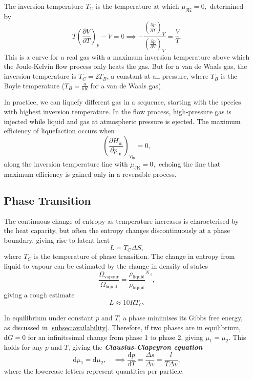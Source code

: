 \documentclass{article}
\theoremstyle{nonumberplain}
\begin{document}
The inversion temperature $T_C$ is the temperature at which $\mu_{\mathrm{JK} } =0,$ determined by 
\[
    T \left( \frac{\partial V}{\partial T} \right)_{p} - V= 0
    \implies 
    -\frac{\left( \frac{\partial p}{\partial T} \right)_{V} }{\left( \frac{\partial p}{\partial V} \right)_{T} } = \frac{V}{T}.
\] 
This is a curve for a real gas with a maximum inversion temperature above which the Joule-Kelvin flow process only heats the gas. But for a van de Waals gas, the inversion temperature is $T_C = 2 T_B$, a constant at all pressure, where $T_B$ is the Boyle temperature ($T_B = \frac{a}{b R}$ for a van de Waals gas).

In practice, we can liquefy different gas in a sequence, starting with the species with highest inversion temperature. In the flow process, high-pressure gas is injected while liquid and gas at atmospheric pressure is ejected. The maximum efficiency of liquefaction occurs when 
\[
    \left(\frac{\partial H_{\mathrm{in}}}{\partial p_\mathrm{in}}  \right)_{T_\mathrm{in}} = 0,
\] along the inversion temperature line with $\mu_{\mathrm{JK} } = 0,$ echoing the line that maximum efficiency is gained only in a reversible process. 

\subsection{Phase Transition}
The continuous change of entropy as temperature increases is characterised by the heat capacity, but often the entropy changes discontinuously at a phase boundary, giving rise to latent heat 
\[
    \boxed{
    L = T_C \Delta S,}
\]
where $T_C$ is the temperature of phase transition. The change in entropy from liquid to vapour can be estimated by the change in density of states 
\[
    \frac{\Omega_{\mathrm{vapour} }}{\Omega_{\mathrm{liquid} }} = \frac{\rho_{\mathrm{liquid} }}{\rho_{\mathrm{liquid} }}^{N_A}, 
\]
giving a rough estimate 
\[
    L \approx 10 R T_C. 
\]

In equilibrium under constant $p$ and $T$, a phase minimises its Gibbs free energy, as discussed in \ref{subsec:availability}. Therefore, if two phases are in equilibrium, $\mathrm{d} G = 0$ for an infinitesimal change from phase 1 to phase 2, giving $\mu_1 = \mu_2.$ This holds for any $p$ and $T$, giving the \textit{\textbf{Clausius-Clapeyron equation}} 
\[
    \mathrm{d} \mu_1 = \mathrm{d} \mu_2, \quad 
    \implies  
    \boxed{
        \frac{\mathrm{d}p}{\mathrm{d}T} = \frac{\Delta s}{\Delta v} = \frac{l}{T \Delta v},  
    }
\]
where the lowercase letters represent quantities per particle. 
\end{document}
